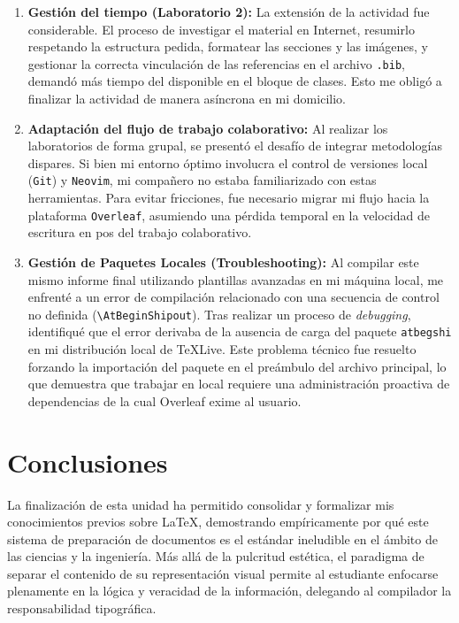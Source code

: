 \begin{enumerate}
	\item \textbf{Gestión del tiempo (Laboratorio 2):} La extensión de la actividad fue considerable. El proceso de investigar el material en Internet, resumirlo respetando la estructura pedida, formatear las secciones y las imágenes, y gestionar la correcta vinculación de las referencias en el archivo \texttt{.bib}, demandó más tiempo del disponible en el bloque de clases. Esto me obligó a finalizar la actividad de manera asíncrona en mi domicilio.

	\item \textbf{Adaptación del flujo de trabajo colaborativo:} Al realizar los laboratorios de forma grupal, se presentó el desafío de integrar metodologías dispares. Si bien mi entorno óptimo involucra el control de versiones local (\texttt{Git}) y \texttt{Neovim}, mi compañero no estaba familiarizado con estas herramientas. Para evitar fricciones, fue necesario migrar mi flujo hacia la plataforma \texttt{Overleaf}, asumiendo una pérdida temporal en la velocidad de escritura en pos del trabajo colaborativo.

	\item \textbf{Gestión de Paquetes Locales (Troubleshooting):} Al compilar este mismo informe final utilizando plantillas avanzadas en mi máquina local, me enfrenté a un error de compilación relacionado con una secuencia de control no definida (\texttt{\textbackslash AtBeginShipout}). Tras realizar un proceso de \textit{debugging}, identifiqué que el error derivaba de la ausencia de carga del paquete \texttt{atbegshi} en mi distribución local de \TeX Live. Este problema técnico fue resuelto forzando la importación del paquete en el preámbulo del archivo principal, lo que demuestra que trabajar en local requiere una administración proactiva de dependencias de la cual Overleaf exime al usuario.
\end{enumerate}

\newpage

\section{Conclusiones}

La finalización de esta unidad ha permitido consolidar y formalizar mis conocimientos previos sobre \LaTeX{}, demostrando empíricamente por qué este sistema de preparación de documentos es el estándar ineludible en el ámbito de las ciencias y la ingeniería. Más allá de la pulcritud estética, el paradigma de separar el contenido de su representación visual permite al estudiante enfocarse plenamente en la lógica y veracidad de la información, delegando al compilador la responsabilidad tipográfica.

